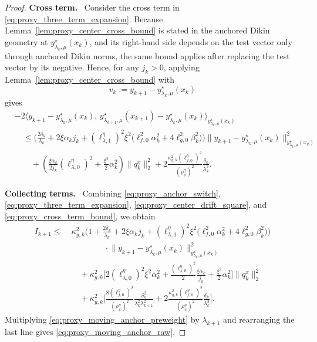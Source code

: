 \documentclass{article}
\newcommand{\proofstep}[1]{\par\smallskip\noindent\textbf{#1}\ }
\begin{document}
\begin{proof}
\proofstep{Cross term.}
Consider the cross term in \eqref{eq:proxy_three_term_expansion}. Because
Lemma~\ref{lem:proxy_center_cross_bound} is stated in the anchored Dikin geometry at
\(y_{\lambda_k,\mu}^\star(x_k)\), and its right-hand side depends on the test vector only through
anchored Dikin norms, the same bound applies after replacing the test vector by its negative. Hence,
for any \(j_k>0\), applying Lemma~\ref{lem:proxy_center_cross_bound} with
\[
v_k:=y_{k+1}-y_{\lambda_k,\mu}^\star(x_k)
\]
gives
\begin{align}
&-2
\Big\langle
y_{k+1}-y_{\lambda_k,\mu}^\star(x_k),\,
y_{\lambda_{k+1},\mu}^\star(x_{k+1})
-y_{\lambda_k,\mu}^\star(x_k)
\Big\rangle_{y_{\lambda_k,\mu}^\star(x_k)}
\nonumber\\
&\quad\le
\Bigg(
\frac{2\delta_k}{\lambda_k}
+
2\xi\alpha_k j_k
+
(\ell_{\lambda,1}^\eta)^2\xi^2
\bigl(\ell_{f,0}^2\alpha_k^2+4\ell_{g,0}^2\beta_k^2\bigr)
\Bigg)
\big\|y_{k+1}-y_{\lambda_k,\mu}^\star(x_k)
\big\|_{y_{\lambda_k,\mu}^\star(x_k)}^2
\nonumber\\
&\qquad
+
\left(
\frac{\xi\alpha_k}{2j_k}(\ell_{\lambda,0}^\eta)^2
+
\frac{\xi^2}{2}\alpha_k^2
\right)
\|q_k^x\|_2^2
+
2\frac{\kappa_{y,k}^2(\ell_{f,0}^\eta)^2}{(\rho_\psi^\eta)^2}
\frac{\delta_k}{\lambda_k^3}.
\label{eq:proxy_cross_term_bound}
\end{align}

\proofstep{Collecting terms.}
Combining \eqref{eq:proxy_anchor_switch}, \eqref{eq:proxy_three_term_expansion},
\eqref{eq:proxy_center_drift_square}, and \eqref{eq:proxy_cross_term_bound}, we obtain
\begin{align}
I_{k+1}
\le\;&
\kappa_{y,k}^2
\Bigg(
1+\frac{2\delta_k}{\lambda_k}
+2\xi\alpha_k j_k
+(\ell_{\lambda,1}^\eta)^2\xi^2
\bigl(\ell_{f,0}^2\alpha_k^2+4\ell_{g,0}^2\beta_k^2\bigr)
\Bigg)
\nonumber\\
&\qquad\qquad\cdot
\big\|y_{k+1}-y_{\lambda_k,\mu}^\star(x_k)
\big\|_{y_{\lambda_k,\mu}^\star(x_k)}^2
\nonumber\\
&\quad
+\kappa_{y,k}^2
\Bigg[
2(\ell_{\lambda,0}^\eta)^2\xi^2\alpha_k^2
+
\frac{(\ell_{\lambda,0}^\eta)^2}{2}\frac{\xi\alpha_k}{j_k}
+
\frac{\xi^2}{2}\alpha_k^2
\Bigg]\|q_k^x\|_2^2
\nonumber\\
&\quad
+\kappa_{y,k}^2
\Bigg[
\frac{8(\ell_{f,0}^\eta)^2}{(\rho_\psi^\eta)^2}
\frac{\delta_k^2}{\lambda_k^2\lambda_{k+1}^2}
+
2\frac{\kappa_{y,k}^2(\ell_{f,0}^\eta)^2}{(\rho_\psi^\eta)^2}
\frac{\delta_k}{\lambda_k^3}
\Bigg].
\label{eq:proxy_moving_anchor_preweight}
\end{align}
Multiplying \eqref{eq:proxy_moving_anchor_preweight} by \(\lambda_{k+1}\) and rearranging the
last line gives \eqref{eq:proxy_moving_anchor_raw}.
\end{proof}
\end{document}
